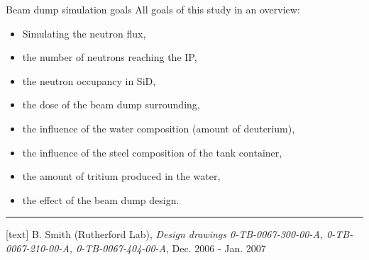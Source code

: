 {\begin{frame}{Beam dump simulation goals}
 \flukalogo
 All goals of this study in an overview:
\begin{itemize}
 \item Simulating the neutron flux,
 \item the number of neutrons reaching the IP,
 \item the neutron occupancy in SiD,
 \item the dose of the beam dump surrounding,
 \item the influence of the water composition (amount of deuterium),
 \item the influence of the steel composition of the tank container,
 \item the amount of tritium produced in the water,
 \item the effect of the beam dump design.
\end{itemize}
\vspace*{0.5cm}
\rule{12cm}{.1pt}
\begin{thebibliography}{9}
[text]
 B. Smith (Rutherford Lab), \emph{Design drawings 0-TB-0067-300-00-A, 0-TB-0067-210-00-A, 0-TB-0067-404-00-A}, Dec. 2006 - Jan. 2007
\end{thebibliography}
\end{frame}
}

